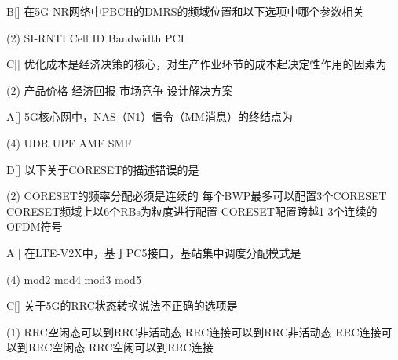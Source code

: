 \begin{choice}{B}[]
    在5G NR网络中PBCH的DMRS的频域位置和以下选项中哪个参数相关
    \begin{tasks}(2)
        \task SI-RNTI
        \task Cell ID
        \task  Bandwidth
        \task PCI
    \end{tasks}
\end{choice}


\begin{choice}{C}[]
    优化成本是经济决策的核心，对生产作业环节的成本起决定性作用的因素为
    \begin{tasks}(2)
        \task 产品价格
        \task 经济回报
        \task 市场竞争
        \task 设计解决方案
    \end{tasks}
\end{choice}


\begin{choice}{A}[]
    5G核心网中，NAS（N1）信令（MM消息）的终结点为
    \begin{tasks}(4)
        \task UDR
        \task UPF
        \task AMF
        \task SMF
    \end{tasks}
\end{choice}



\begin{choice}{D}[]
    以下关于CORESET的描述错误的是
    \begin{tasks}(2)
        \task CORESET的频率分配必须是连续的
        \task 每个BWP最多可以配置3个CORESET
        \task CORESET频域上以6个RBs为粒度进行配置
        \task CORESET配置跨越1-3个连续的OFDM符号
    \end{tasks}
\end{choice}


\begin{choice}{A}[]
    在LTE-V2X中，基于PC5接口，基站集中调度分配模式是
    \begin{tasks}(4)
        \task mod2
        \task mod4
        \task mod3
        \task mod5
    \end{tasks}
\end{choice}


\begin{choice}{C}[]
    关于5G的RRC状态转换说法不正确的选项是
    \begin{tasks}(1)
        \task RRC空闲态可以到RRC非活动态
        \task RRC连接可以到RRC非活动态
        \task RRC连接可以到RRC空闲态
        \task RRC空闲可以到RRC连接
    \end{tasks}
\end{choice}


